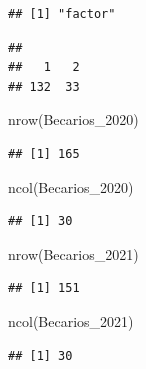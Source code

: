 \documentclass[
]{article}
\newenvironment{Shaded}{\begin{snugshade}}{\end{snugshade}}
\newcommand{\FunctionTok}[1]{\textcolor[rgb]{0.00,0.00,0.00}{#1}}
\newcommand{\NormalTok}[1]{#1}
\newcommand{\SpecialCharTok}[1]{\textcolor[rgb]{0.00,0.00,0.00}{#1}}
\begin{document}
\begin{verbatim}
## [1] "factor"
\end{verbatim}

\begin{Shaded}
\end{Shaded}

\begin{verbatim}
## 
##   1   2 
## 132  33
\end{verbatim}

\begin{Shaded}
\begin{Highlighting}[]
\FunctionTok{nrow}\NormalTok{(Becarios\_2020)}
\end{Highlighting}
\end{Shaded}

\begin{verbatim}
## [1] 165
\end{verbatim}

\begin{Shaded}
\begin{Highlighting}[]
\FunctionTok{ncol}\NormalTok{(Becarios\_2020)}
\end{Highlighting}
\end{Shaded}

\begin{verbatim}
## [1] 30
\end{verbatim}

\begin{Shaded}
\begin{Highlighting}[]
\FunctionTok{nrow}\NormalTok{(Becarios\_2021)}
\end{Highlighting}
\end{Shaded}

\begin{verbatim}
## [1] 151
\end{verbatim}

\begin{Shaded}
\begin{Highlighting}[]
\FunctionTok{ncol}\NormalTok{(Becarios\_2021)}
\end{Highlighting}
\end{Shaded}

\begin{verbatim}
## [1] 30
\end{verbatim}
\end{document}
